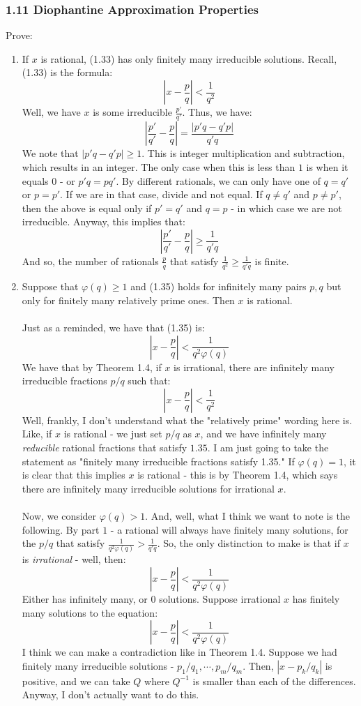 \documentclass[12pt,a4paper]{article}
\newcommand{\1}[1]{\mathbbm{1}\left\{ #1 \right\}}
\begin{document}
\subsubsection{1.11 Diophantine Approximation Properties} Prove:
\begin{enumerate}
	\item If $x$ is rational, (1.33) has only finitely many irreducible solutions. Recall, (1.33) is the formula:
	$$
		\left|x - \frac{p}{q}\right| < \frac{1}{q^2}
	$$
	Well, we have $x$ is some irreducible $\frac{p'}{q'}$. Thus, we have:
	$$
		\left|\frac{p'}{q'} - \frac{p}{q}\right| = \frac{|p'q-q'p|}{q'q}
	$$
	We note that $|p'q-q'p| \geq 1$. This is integer multiplication and subtraction, which results in an integer. The only case when this is less than $1$ is when it equals $0$ - or $p'q = pq'$. By different rationals, we can only have one of $q = q'$ or $p = p'$. If we are in that case, divide and not equal. If $q \neq q'$ and $p \neq p'$, then the above is equal only if $p' = q'$ and $q = p$ - in which case we are not irreducible. Anyway, this implies that:
	$$
		\left|\frac{p'}{q'} - \frac{p}{q}\right| \geq \frac{1}{q'q}
	$$
	And so, the number of rationals $\frac{p}{q}$ that satisfy $\frac{1}{q^2} \geq \frac{1}{q'q}$ is finite.
	
	\item Suppose that $\varphi(q) \geq 1$ and (1.35) holds for infinitely many pairs $p,q$ but only for finitely many relatively prime ones. Then $x$ is rational.
	\\\\
	Just as a reminded, we have that (1.35) is:
	$$
		\left|x - \frac{p}{q}\right| < \frac{1}{q^2\varphi(q)}
	$$
	We have that by Theorem 1.4, if $x$ is irrational, there are infinitely many irreducible fractions $p/q$ such that:
	$$
		\left|x - \frac{p}{q}\right| < \frac{1}{q^2}
	$$
	Well, frankly, I don't understand what the "relatively prime" wording here is. Like, if $x$ is rational - we just set $p/q$ as $x$, and we have infinitely many \textit{reducible} rational fractions that satisfy $1.35$. I am just going to take the statement as "finitely many irreducible fractions satisfy 1.35." If $\varphi(q) = 1$, it is clear that this implies $x$ is rational - this is by Theorem 1.4, which says there are infinitely many irreducible solutions for irrational $x$.
	\\\\
	Now, we consider $\varphi(q) > 1$. And, well, what I think we want to note is the following. By part $1$ - a rational will always have finitely many solutions, for the $p/q$ that satisfy $\frac{1}{q^2\varphi(q)} > \frac{1}{q'q}$. So, the only distinction to make is that if $x$ is \textit{irrational} - well, then:
	$$
		\left|x - \frac{p}{q}\right| < \frac{1}{q^2\varphi(q)}
	$$
	Either has infinitely many, or $0$ solutions. Suppose irrational $x$ has finitely many solutions to the equation:
	$$
		\left|x - \frac{p}{q}\right| < \frac{1}{q^2\varphi(q)}
	$$
	I think we can make a contradiction like in Theorem 1.4. Suppose we had finitely many irreducible solutions - $p_1/q_1, \cdots, p_m/q_m$. Then, $|x - p_k/q_k|$ is positive, and we can take $Q$ where $Q^{-1}$ is smaller than each of the differences. Anyway, I don't actually want to do this.
	

\end{enumerate}
\end{document}
